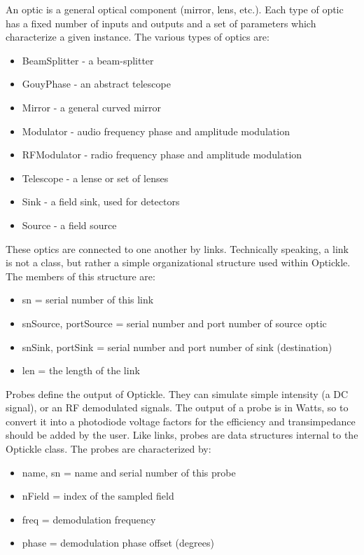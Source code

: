 \documentclass[12pt]{article}
\begin{document}
An optic is a general optical component (mirror, lens, etc.).
Each type of optic has a fixed number of inputs and outputs and a set of parameters which characterize a given instance.  The various types of optics are:
\begin{itemize}
  \item BeamSplitter - a beam-splitter
  \item GouyPhase - an abstract telescope
  \item Mirror - a general curved mirror
  \item Modulator - audio frequency phase and amplitude modulation
  \item RFModulator - radio frequency phase and amplitude modulation
  \item Telescope - a lense or set of lenses
  \item Sink - a field sink, used for detectors
  \item Source - a field source
\end{itemize}

These optics are connected to one another by links.
Technically speaking, a link is not a class, but rather a simple organizational structure used within Optickle.
The members of this structure are:
\begin{itemize}
  \item sn = serial number of this link
  \item snSource, portSource = serial number and port number of source optic
  \item snSink, portSink = serial number and port number of sink (destination)
  \item len = the length of the link
\end{itemize}

Probes define the output of Optickle.
They can simulate simple intensity (a DC signal), or an RF demodulated signals.
The output of a probe is in Watts, so to convert it into a photodiode voltage factors for the efficiency and transimpedance should be added by the user.  Like links, probes are data structures internal to the Optickle class.
The probes are characterized by:
\begin{itemize}
  \item name, sn = name and serial number of this probe
  \item nField = index of the sampled field
  \item freq = demodulation frequency
  \item phase = demodulation phase offset (degrees)
\end{itemize}
\end{document}
